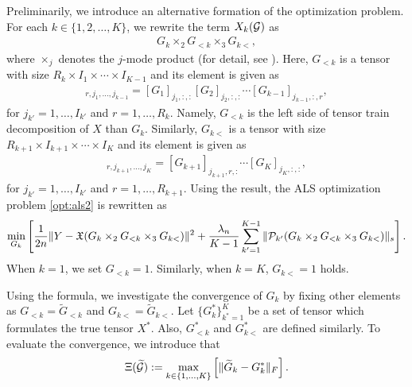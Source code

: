 Preliminarily, we introduce an alternative formation of the optimization problem.
For each $k \in \{1,2,\ldots,K\}$, we rewrite the term $X_k (\mathcal{G})$ as
\begin{align*}
	G_k \times_2 G_{<k} \times_3 G_{k<},
\end{align*}
where $\times_j$ denotes the $j$-mode product (for detail, see \cite{kolda2009tensor}).
Here, $G_{<k}$ is a tensor with size $R_k \times I_1 \times \cdots \times I_{K-1}$ and its element is given as
\begin{align*}
	[G_{<k}]_{r,j_1,\ldots,j_{k-1}} = [G_1]_{j_1,:,:}[G_2]_{j_2,:,:} \cdots [G_{k-1}]_{j_{k-1},:,r},
\end{align*}
for $j_{k'} = 1,\ldots,I_{k'}$ and $r = 1,\ldots,R_k$.
Namely, $G_{<k}$ is the left side of tensor train decomposition of $X$ than $G_k$.
Similarly, $G_{k<}$ is a tensor with size $R_{k+1} \times I_{k+1} \times \cdots \times I_{K}$ and its element is given as
\begin{align*}
	[G_{k<}]_{r,j_{k+1},\ldots,j_{K}} = [G_{k+1}]_{j_{k+1},r,:}\cdots [G_{K}]_{j_{K},:,:},
\end{align*}
for $j_{k'} = 1,\ldots,I_{k'}$ and $r = 1,\ldots,R_{k+1}$.
Using the result, the ALS optimization problem \eqref{opt:als2} is rewritten as
\begin{align}
	\min_{G_k} \left[ \frac{1}{2n} \|Y - \mathfrak{X}(G_k \times_2 G_{<k} \times_3 G_{k<})\|^2 + \frac{\lambda_n}{K-1}\sum_{k'=1}^{K-1} \|\mathcal{P}_{k'}(G_k \times_2 G_{<k} \times_3 G_{k<})\|_{s} \right]. \label{opt:als3}
\end{align}
When $k=1$, we set $G_{<k} = 1$.
Similarly, when $k=K$, $G_{k<} = 1$ holds.

Using the formula, we investigate the convergence of $G_k$ by fixing other elements as $G_{<k} = \tilde{G}_{<k}$ and $G_{k<} = \tilde{G}_{k<}$.
Let $\{G_k^*\}_{k^*=1}^K$ be a set of tensor which formulates the true tensor $X^*$.
Also, $G_{<k}^*$ and $G_{k<}^*$ are defined similarly.
To evaluate the convergence, we introduce that
\begin{align*}
	\Xi(\widetilde{\mathcal{G}}) := \max_{k \in \{1,\ldots,K\}} \left[\|\widetilde{G}_k - G_k^*\|_F \right].
\end{align*}

